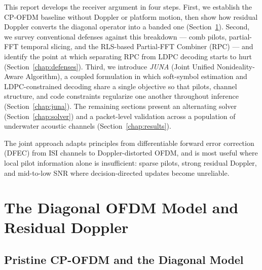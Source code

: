 \documentclass{wileysev}
\begin{document}
	This report develops the receiver argument in four steps. First, we establish the CP-OFDM baseline without Doppler or platform motion, then show how residual Doppler converts the diagonal operator into a banded one (Section~\ref{chap:doppler}). Second, we survey conventional defenses against this breakdown --- comb pilots, partial-FFT temporal slicing, and the RLS-based Partial-FFT Combiner (RPC) --- and identify the point at which separating RPC from LDPC decoding starts to hurt (Section~\ref{chap:defenses}). Third, we introduce \emph{JUNA} (Joint Unified Nonideality-Aware Algorithm), a coupled formulation in which soft-symbol estimation and LDPC-constrained decoding share a single objective so that pilots, channel structure, and code constraints regularize one another throughout inference (Section~\ref{chap:juna}). The remaining sections present an alternating solver (Section~\ref{chap:solver}) and a packet-level validation across a population of underwater acoustic channels (Section~\ref{chap:results}).
	
	The joint approach adapts principles from differentiable forward error correction (DFEC) from ISI channels to Doppler-distorted OFDM, and is most useful where local pilot information alone is insufficient: sparse pilots, strong residual Doppler, and mid-to-low SNR where decision-directed updates become unreliable.
	
	\section{The Diagonal OFDM Model and Residual Doppler}
	\label{chap:doppler}
	
	\subsection{Pristine CP-OFDM and the Diagonal Model}
	\label{ssec:diagonal_baseline}
	
\end{document}
